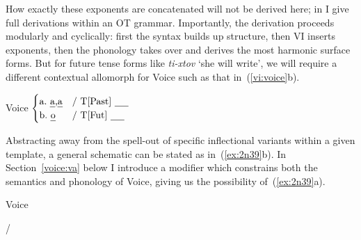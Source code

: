 \begin{exe}
\begin{xlist}
\begin{exe}
\begin{xlist}
\begin{exe}
\begin{xlist}
\begin{exe}
\begin{exe}
\begin{xlist}
\begin{exe}
\begin{xlist}
\begin{exe}
\begin{xlist}
\begin{exe}
\begin{xlist}
\begin{exe}
\begin{xlist}
\begin{exe}
\begin{xlist}
\begin{exe}
\begin{xlist}
\begin{exe}
\begin{xlist}
\begin{exe}
\begin{xlist}
\begin{exe}
\begin{xlist}
\begin{exe}
\begin{xlist}
\begin{exe}
\begin{xlist}
\begin{exe}
\begin{exe}
\begin{xlist}
\begin{exe}
\begin{xlist}
\begin{exe}
\begin{xlist}
\begin{exe}
\begin{xlist}
{\begin{exe}
\begin{xlist}
\begin{exe}
\begin{xlist}
\begin{exe}
\begin{xlist}
\begin{exe}
\begin{xlist}
\begin{xlist}
\begin{xlist}
\begin{exe}
\begin{xlist}
\begin{xlist}
\begin{xlist}
How exactly these exponents are concatenated will not be derived here; in \cite{kastner18nllt} I give full derivations within an OT grammar. Importantly, the derivation proceeds modularly and cyclically: first the syntax builds up structure, then VI inserts exponents, then the phonology takes over and derives the most harmonic surface forms. But for future tense forms like \emph{ti-xtov} `she will write', we will require a different contextual allomorph for Voice such as that in~(\ref{vi:voice}b).
 \begin{exe}
\ex  \label{vi:voice} Voice \lra $\begin{cases} 
		\text{a.~\emph{a},\emph{a}} & \text{/ T[Past] \trace}\\
		\text{b.~\emph{o}} & \text{/ T[Fut] \trace}\\
		\end{cases}$
 \z 

Abstracting away from the spell-out of specific inflectional variants within a given template, a general schematic can be stated as in~(\ref{ex:2n39}b). In Section~\ref{voice:va} below I introduce a modifier which constrains both the semantics and phonology of Voice, giving us the possibility of~(\ref{ex:2n39}a).
 \begin{exe}
 \ex  \label{ex:2n39}Voice {\lra} 
 \begin{xlist} 
 	\ex   {\tpie} / {\trace} {\va} 
 	\ex   {\tkal} 
 \z
\z 


\end{xlist}
\end{exe}
\end{exe}
\end{xlist}
\end{xlist}
\end{xlist}
\end{exe}
\end{xlist}
\end{xlist}
\end{xlist}
\end{exe}
\end{xlist}
\end{exe}
\end{xlist}
\end{exe}
\end{xlist}
\end{exe}}
\end{xlist}
\end{exe}
\end{xlist}
\end{exe}
\end{xlist}
\end{exe}
\end{xlist}
\end{exe}
\end{exe}
\end{xlist}
\end{exe}
\end{xlist}
\end{exe}
\end{xlist}
\end{exe}
\end{xlist}
\end{exe}
\end{xlist}
\end{exe}
\end{xlist}
\end{exe}
\end{xlist}
\end{exe}
\end{xlist}
\end{exe}
\end{xlist}
\end{exe}
\end{xlist}
\end{exe}
\end{xlist}
\end{exe}
\end{xlist}
\end{exe}
\end{exe}
\end{xlist}
\end{exe}
\end{xlist}
\end{exe}
\end{xlist}
\end{exe}
